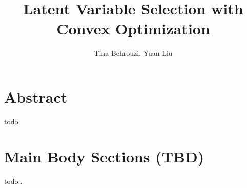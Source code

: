 \documentclass[9pt,technote]{IEEEtran}
\begin{document}
\title{Latent Variable Selection with Convex Optimization}
\author{Tina Behrouzi, Yuan Liu}


\maketitle

\section*{Abstract}
todo\\
\vfill\null

\section*{Main Body Sections (TBD)}
todo..\\
\vfill\null
\end{document}
